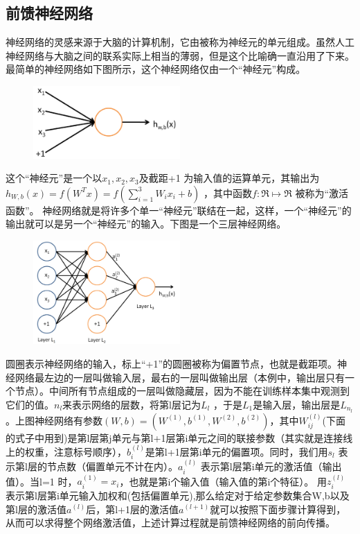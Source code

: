 \documentclass[UTF8]{ctexart}
\begin{document}
\subsection{前馈神经网络}
	神经网络的灵感来源于大脑的计算机制，它由被称为神经元的单元组成。虽然人工神经网络与大脑之间的联系实际上相当的薄弱，但是这个比喻确一直沿用了下来。最简单的神经网络如下图所示，这个神经网络仅由一个“神经元”构成。
	\begin{figure}[H]
		\centering 
		\includegraphics[width=0.5\textwidth]{SingleNeuron}
	\end{figure}
	这个“神经元”是一个以$x_1, x_2, x_3$及截距+1 为输入值的运算单元，其输出为 $h_{W,b}(x) = f(W^Tx) = f(\sum_{i=1}^3 W_{i}x_i +b)$ ，其中函数$f : \Re \mapsto \Re$ 被称为“激活函数”。
	神经网络就是将许多个单一“神经元”联结在一起，这样，一个“神经元”的输出就可以是另一个“神经元”的输入。下图是一个三层神经网络。
	\begin{figure}[H]
		\centering
		\includegraphics[width=0.5\textwidth]{Network331}
	\end{figure}
	圆圈表示神经网络的输入，标上“+1”的圆圈被称为偏置节点，也就是截距项。神经网络最左边的一层叫做输入层，最右的一层叫做输出层（本例中，输出层只有一个节点）。中间所有节点组成的一层叫做隐藏层，因为不能在训练样本集中观测到它们的值。$n_l$来表示网络的层数，将第l层记为$L_l$ ，于是$L_1$是输入层，输出层是$L_{n_l}$。上图神经网络有参数$(W,b) = (W^{(1)}, b^{(1)}, W^{(2)},b^{(2)})$，其中$W^{(l)}_{ij}$(下面的式子中用到)是第l层第j单元与第l+1层第i单元之间的联接参数（其实就是连接线上的权重，注意标号顺序），$b^{(l)}_i$是第l+1层第i单元的偏置项。同时，我们用$s_l$ 表示第l层的节点数（偏置单元不计在内）。$a^{(l)}_i$ 表示第l层第i单元的激活值（输出值）。当l=1 时，$a^{(1)}_i = x_i$，也就是第i个输入值（输入值的第i个特征）。	用$z^{(l)}_i$表示第l层第i单元输入加权和(包括偏置单元),那么给定对于给定参数集合W,b以及第l层的激活值$a^{(l)}$后，第l+1层的激活值$a^{(l+1)}$就可以按照下面步骤计算得到，从而可以求得整个网络激活值，上述计算过程就是前馈神经网络的前向传播。
\end{document}
